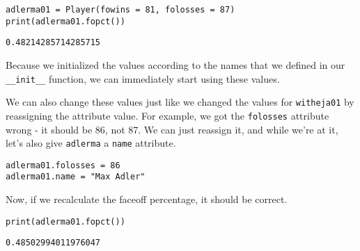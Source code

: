 \begin{lstlisting}[style=pippython]
adlerma01 = Player(fowins = 81, folosses = 87)
print(adlerma01.fopct())
\end{lstlisting}
\begin{lstlisting}[style=none]
0.48214285714285715
\end{lstlisting}
Because we initialized the values according to the names that we defined in our \verb|__init__| function, we can immediately start using these values.\par
We can also change these values just like we changed the values for \verb|witheja01| by reassigning the attribute value. For example, we got the \verb|folosses| attribute wrong - it should be 86, not 87. We can just reassign it, and while we're at it, let's also give \verb|adlerma| a \verb|name| attribute.\par
\begin{lstlisting}[style=pippython]
adlerma01.folosses = 86
adlerma01.name = "Max Adler"
\end{lstlisting}
Now, if we recalculate the faceoff percentage, it should be correct.\par
\begin{lstlisting}[style=pippython]
print(adlerma01.fopct())
\end{lstlisting}
\begin{lstlisting}[style=none]
0.48502994011976047
\end{lstlisting}
